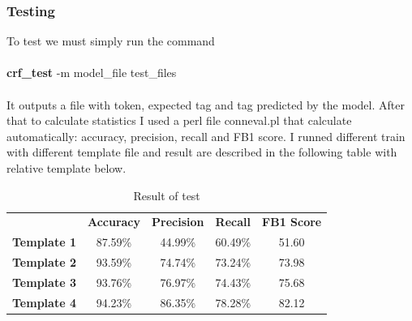 \documentclass[a4paper,8pt,oneside]{article}
\begin{document}
		\subsubsection{Testing}
			To test we must simply run the command \\ \\
			\textbf{crf\_test} -m model\_file test\_files \\ \\
			It outputs a file with token, expected tag and tag predicted by the model. After that to calculate statistics I used a perl file conneval.pl that calculate automatically: accuracy, precision, recall and FB1 score. I runned different train with different template file and result are described in the following table with relative template below.
			\begin{table}[h]
				\centering
				\begin{tabular}{ccccc}
					& \textbf{Accuracy} & \textbf{Precision} & \textbf{Recall}  & \textbf{FB1 Score} \\
					\textbf{Template 1} & 87.59\%  & 44.99\%   & 60.49\% & 51.60    \\
					\textbf{Template 2} & 93.59\%  & 74.74\%   & 73.24\% & 73.98     \\
					\textbf{Template 3} & 93.76\%  & 76.97\%   & 74.43\% & 75.68    \\
					\textbf{Template 4} & 94.23\%  & 86.35\%   & 78.28\% & 82.12    \\
				\end{tabular}
				\caption{Result of test}

			\end{table}
\end{document}
